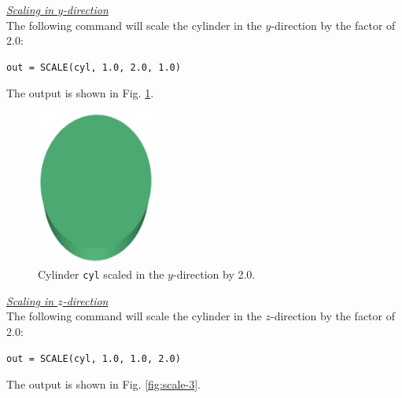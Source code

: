 \noindent
\underline{\em Scaling in $y$-direction}\\

The following command will 
scale the cylinder in the $y$-direction by the factor of 2.0: \\

\begin{bbox}
\begin{verbatim}
out = SCALE(cyl, 1.0, 2.0, 1.0)
\end{verbatim}
\end{bbox}
\vspace{6mm}

\noindent
The output is shown in Fig. \ref{fig:scale-2}.


\begin{figure}[!ht]
\begin{center}
\includegraphics[width=0.35\textwidth]{img/scale-2.png}
\end{center}
\vspace{-4mm}
\caption{Cylinder {\tt cyl} scaled in the $y$-direction by 2.0.}
\label{fig:scale-2}
\end{figure}

\newpage
\noindent
\underline{\em Scaling in $z$-direction}\\

The following command will 
scale the cylinder in the $z$-direction by the factor of 2.0: \\

\begin{bbox}
\begin{verbatim}
out = SCALE(cyl, 1.0, 1.0, 2.0)
\end{verbatim}
\end{bbox}
\vspace{6mm}

\noindent
The output is shown in Fig. \ref{fig:scale-3}.

